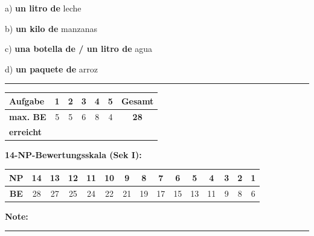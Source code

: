 \documentclass[11pt, a4paper]{article}
\newcommand{\luecke}[1]{\rule{#1}{0.4pt}}
\newcommand{\lsg}[1]{\textcolor{loesung}{\textbf{#1}}}
\begin{document}
\noindent
a) \lsg{un litro de} leche

\vspace{0.8em}

\noindent
b) \lsg{un kilo de} manzanas

\vspace{0.8em}

\noindent
c) \lsg{una botella de / un litro de} agua

\vspace{0.8em}

\noindent
d) \lsg{un paquete de} arroz


\vspace{25pt}
\hrule
\vspace{10pt}

\noindent
\begin{tabularx}{\textwidth}{|X|c|c|c|c|c||c|}
\hline
\textbf{Aufgabe} & 1 & 2 & 3 & 4 & 5 & \textbf{Gesamt} \\
\hline
\textbf{max. BE} & 5 & 5 & 6 & 8 & 4 & \textbf{28} \\
\hline
\textbf{erreicht} & & & & & & \\[0.8em]
\hline
\end{tabularx}

\vspace{15pt}


\noindent\textbf{14-NP-Bewertungsskala (Sek I):}

\vspace{0.5em}

\noindent
\begin{tabularx}{\textwidth}{|c|c|c|c|c|c|c|c|c|c|c|c|c|c|c|}
\hline
\textbf{NP} & 14 & 13 & 12 & 11 & 10 & 9 & 8 & 7 & 6 & 5 & 4 & 3 & 2 & 1 \\
\hline
\textbf{BE} & 28 & 27 & 25 & 24 & 22 & 21 & 19 & 17 & 15 & 13 & 11 & 9 & 8 & 6 \\
\hline
\end{tabularx}

\vspace{10pt}

\begin{flushright}
\textbf{Note:} \luecke{2cm}
\end{flushright}
\end{document}
